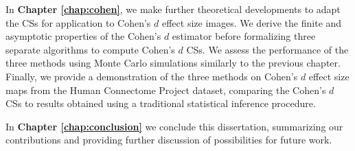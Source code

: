 In \textbf{Chapter \ref{chap:cohen}}, we make further theoretical developments to adapt the CSs for application to Cohen's $d$ effect size images. We derive the finite and asymptotic properties of the Cohen's $d$ estimator before formalizing three separate algorithms to compute Cohen's $d$ CSs. We assess the performance of the three methods using Monte Carlo simulations similarly to the previous chapter. Finally, we provide a demonstration of the three methods on Cohen's $d$ effect size maps from the Human Connectome Project dataset, comparing the Cohen's $d$ CSs to results obtained using a traditional statistical inference procedure.    

In \textbf{Chapter \ref{chap:conclusion}} we conclude this dissertation, summarizing our contributions and providing further discussion of possibilities for future work. 

